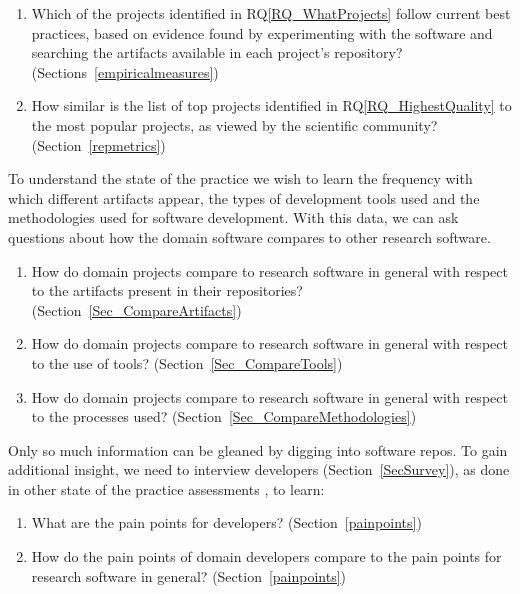 \documentclass[runningheads]{llncs}
\newcounter{rqnum} %
\newcommand{\rqref}[1]{RQ\ref{#1}}
\begin{document}
\begin{enumerate}
	\item [RQ\refstepcounter{rqnum}\therqnum \label{RQ_HighestQuality}:] Which
	of the projects identified in \rqref{RQ_WhatProjects} follow current best
	practices, based on evidence found by experimenting with the software and
	searching the artifacts available in each project's repository?
	(Sections~\ref{empiricalmeasures})
	\item [RQ\refstepcounter{rqnum}\therqnum \label{RQ_CompareHQ2Popular}:] How
	similar is the list of top projects identified in \rqref{RQ_HighestQuality}
	to the most popular projects, as viewed by the scientific community?
	(Section~\ref{repmetrics})
\end{enumerate}

To understand the state of the practice we wish to learn the frequency with
which different artifacts appear, the types of development tools used and the
methodologies used for software development.  With this data, we can ask
questions about how the domain software compares to other research software.

\begin{enumerate}
  \item [RQ\refstepcounter{rqnum}\therqnum \label{RQ_CompareArtifacts}:] How
	do domain projects compare to research software in general with respect to the
	artifacts present in their repositories? (Section~\ref{Sec_CompareArtifacts})
	\item [RQ\refstepcounter{rqnum}\therqnum \label{RQ_CompareToolsProjMngmnt}:]
	How do domain projects compare to research software in general with respect to
	the use of tools? (Section~\ref{Sec_CompareTools})
	\item [RQ\refstepcounter{rqnum}\therqnum \label{RQ_CompareMethodologies}:]
	How do domain projects compare to research software in general with respect to
	the processes used? (Section~\ref{Sec_CompareMethodologies})
\end{enumerate}	

Only so much information can be gleaned by digging into software repos. To gain
additional insight, we need to interview developers (Section~\ref{SecSurvey}),
as done in other state of the practice assessments \cite{Kelly2013}, to learn:

\begin{enumerate}
	\item [RQ\refstepcounter{rqnum}\therqnum \label{RQ_PainPoints}:] What are
	the pain points for developers?
	(Section~\ref{painpoints})
	\item [RQ\refstepcounter{rqnum}\therqnum \label{RQ_ComparePainPoints}:] How
	do the pain points of domain developers compare to the pain points
	for research software in general? (Section~\ref{painpoints})
\end{enumerate}
\end{document}
